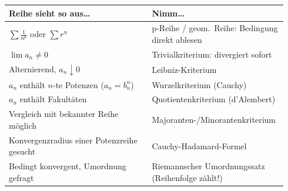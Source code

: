 \begin{center}
\begin{minipage}[t]{0.4\linewidth}
{\fontsize{6.3pt}{7.6pt}\selectfont
\renewcommand{\arraystretch}{1.25}
\setlength{\tabcolsep}{4pt}
\begin{tabular}{>{\raggedright\arraybackslash}p{0.5\linewidth}>{\raggedright\arraybackslash}p{0.44\linewidth}}
\textbf{Reihe sieht so aus\ldots} & \textbf{Nimm\ldots}\\
\hline
$\sum \frac1{n^p}$ oder $\sum r^n$ & p-Reihe / geom.\ Reihe: Bedingung direkt ablesen\\
$\lim a_n\neq0$ & Trivialkriterium: divergiert sofort\\
Alternierend, $a_n\downarrow0$ & Leibniz-Kriterium\\
$a_n$ enth\"alt $n$-te Potenzen ($a_n=b_n^n$) & Wurzelkriterium (Cauchy)\\
$a_n$ enth\"alt Fakult\"aten & Quotientenkriterium (d'Alembert)\\
Vergleich mit bekannter Reihe m\"oglich & Majoranten-/Minorantenkriterium\\
Konvergenzradius einer Potenzreihe gesucht & Cauchy-Hadamard-Formel\\
Bedingt konvergent, Umordnung gefragt & Riemannscher Umordnungssatz (Reihenfolge z\"ahlt!)\\
\end{tabular}
}
\end{minipage}
\end{center}